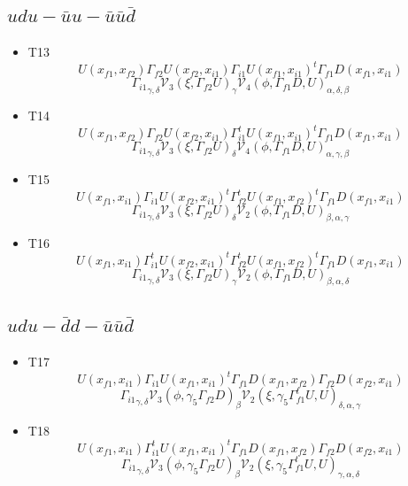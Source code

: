 \documentclass{article}[12pt]
\begin{document}
\subsection{$udu-\bar{u}u-\bar{u}\bar{u}\bar{d}$}
\begin{itemize}
\item T13
$$U(x_{f1},x_{f2})\Gamma_{f2}U(x_{f2},x_{i1})\Gamma_{i1}U(x_{f1},x_{i1})^t\Gamma_{f1}D(x_{f1},x_{i1})$$
$${\Gamma_{i1}}_{\gamma,\delta}{\mathcal V}_3\left(\xi,\Gamma_{f2}U\right)_{\gamma}{\mathcal V}_4\left(\phi,\Gamma_{f1}D,U\right)_{\alpha,\delta,\beta}$$
\item T14
$$U(x_{f1},x_{f2})\Gamma_{f2}U(x_{f2},x_{i1})\Gamma_{i1}^tU(x_{f1},x_{i1})^t\Gamma_{f1}D(x_{f1},x_{i1})$$
$${\Gamma_{i1}}_{\gamma,\delta}{\mathcal V}_3\left(\xi,\Gamma_{f2}U\right)_{\delta}{\mathcal V}_4\left(\phi,\Gamma_{f1}D,U\right)_{\alpha,\gamma,\beta}$$
\item T15
$$U(x_{f1},x_{i1})\Gamma_{i1}U(x_{f2},x_{i1})^t\Gamma_{f2}^tU(x_{f1},x_{f2})^t\Gamma_{f1}D(x_{f1},x_{i1})$$
$${\Gamma_{i1}}_{\gamma,\delta}{\mathcal V}_3\left(\xi,\Gamma_{f2}U\right)_{\delta}{\mathcal V}_2\left(\phi,\Gamma_{f1}D,U\right)_{\beta,\alpha,\gamma}$$
\item T16
$$U(x_{f1},x_{i1})\Gamma_{i1}^tU(x_{f2},x_{i1})^t\Gamma_{f2}^tU(x_{f1},x_{f2})^t\Gamma_{f1}D(x_{f1},x_{i1})$$
$${\Gamma_{i1}}_{\gamma,\delta}{\mathcal V}_3\left(\xi,\Gamma_{f2}U\right)_{\gamma}{\mathcal V}_2\left(\phi,\Gamma_{f1}D,U\right)_{\beta,\alpha,\delta}$$
\end{itemize}
\subsection{$udu-\bar{d}d-\bar{u}\bar{u}\bar{d}$}
\begin{itemize}
\item T17
$$U(x_{f1},x_{i1})\Gamma_{i1}U(x_{f1},x_{i1})^t\Gamma_{f1}D(x_{f1},x_{f2})\Gamma_{f2}D(x_{f2},x_{i1})$$
$${\Gamma_{i1}}_{\gamma,\delta}{\mathcal V}_3\left(\phi,\gamma_5\Gamma_{f2}D\right)_{\beta}{\mathcal V}_2\left(\xi,\gamma_5\Gamma_{f1}^tU,U\right)_{\delta,\alpha,\gamma}$$
\item T18
$$U(x_{f1},x_{i1})\Gamma_{i1}^tU(x_{f1},x_{i1})^t\Gamma_{f1}D(x_{f1},x_{f2})\Gamma_{f2}D(x_{f2},x_{i1})$$
$${\Gamma_{i1}}_{\gamma,\delta}{\mathcal V}_3\left(\phi,\gamma_5\Gamma_{f2}U\right)_{\beta}{\mathcal V}_2\left(\xi,\gamma_5\Gamma_{f1}^tU,U\right)_{\gamma,\alpha,\delta}$$
\end{itemize}
\end{document}
